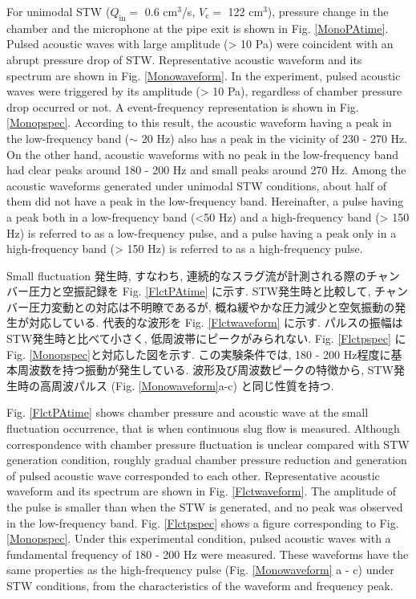 \documentclass[12pt]{article}
\begin{document}
For unimodal STW ($Q_\mathrm{in}=$ 0.6 cm$^3$/s, $V_\mathrm{c}=$ 122 cm$^3$), pressure change in the chamber and the microphone at the pipe exit is shown in Fig. \ref{MonoPAtime}.
Pulsed acoustic waves with large amplitude (> 10 Pa) were coincident with an abrupt pressure drop of STW.
Representative acoustic waveform and its spectrum are shown in Fig. \ref{Monowaveform}.
In the experiment, pulsed acoustic waves were triggered by its amplitude (> 10 Pa), regardless of chamber pressure drop occurred or not. 
A event-frequency representation is shown in Fig. \ref{Monopspec}. 
According to this result, the acoustic waveform having a peak in the low-frequency band ($\sim$ 20 Hz) also has a peak in the vicinity of 230 - 270 Hz.
On the other hand, acoustic waveforms with no peak in the low-frequency band had clear peaks around 180 - 200 Hz and small peaks around 270 Hz.
Among the acoustic waveforms generated under unimodal STW conditions, about half of them did not have a peak in the low-frequency band.
Hereinafter, a pulse having a peak both in a low-frequency band (<50 Hz) and a high-frequency band (> 150 Hz) is referred to as a low-frequency pulse, and a pulse having a peak only in a high-frequency band (> 150 Hz) is referred to as a high-frequency pulse.



Small fluctuation 発生時, すなわち, 連続的なスラグ流が計測される際のチャンバー圧力と空振記録を Fig. \ref{FlctPAtime} に示す.  
STW発生時と比較して, チャンバー圧力変動との対応は不明瞭であるが, 概ね緩やかな圧力減少と空気振動の発生が対応している. 代表的な波形を Fig. \ref{Flctwaveform} に示す. 
パルスの振幅はSTW発生時と比べて小さく, 低周波帯にピークがみられない. 
Fig. \ref{Flctpspec} に Fig. \ref{Monopspec}と対応した図を示す. 
この実験条件では, 180 - 200 Hz程度に基本周波数を持つ振動が発生している. 
波形及び周波数ピークの特徴から, STW発生時の高周波パルス (Fig. \ref{Monowaveform}a-c) と同じ性質を持つ. 

Fig. \ref{FlctPAtime} shows chamber pressure and acoustic wave at the small fluctuation occurrence, that is when continuous slug flow is measured.
Although correspondence with chamber pressure fluctuation is unclear compared with STW generation condition, roughly gradual chamber pressure reduction and generation of pulsed acoustic wave corresponded to each other.
Representative acoustic waveform and its spectrum are shown in Fig. \ref{Flctwaveform}.
The amplitude of the pulse is smaller than when the STW is generated, and no peak was observed in the low-frequency band.
Fig. \ref{Flctpspec} shows a figure corresponding to Fig. \ref{Monopspec}.
Under this experimental condition, pulsed acoustic waves with a fundamental frequency of 180 - 200 Hz were measured.
These waveforms have the same properties as the high-frequency pulse (Fig. \ref {Monowaveform} a - c) under STW conditions, from the characteristics of the waveform and frequency peak.
\end{document}
